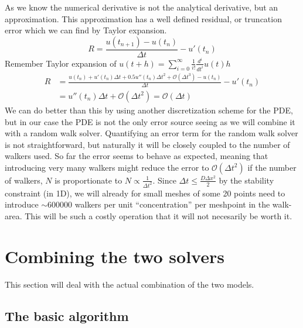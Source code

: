 As we know the numerical derivative is not the analytical derivative, but an approximation. 
This approximation has a well defined residual, or truncation error which we can find by Taylor expansion.
\begin{equation*}
  R = \frac{u(t_{n+1}) -u(t_n)}{\Delta t} -u'(t_n)
\end{equation*}
Remember Taylor expansion of $u(t+h) = \sum\limits_{i=0}^\infty\frac{1}{i!}\frac{d^i}{dt^i}u(t)h$
\begin{align*}
 R &= \frac{u(t_n)+u'(t_n)\Delta t +0.5u''(t_n)\Delta t^2 + \mathcal{O}(\Delta t^3)-u(t_n)}{\Delta t} -u'(t_n)\\
  &= u''(t_n)\Delta t+ \mathcal{O}(\Delta t^2) = \mathcal{O}(\Delta t)
\end{align*}
We can do better than this by using another discretization scheme for the PDE, but in our case the PDE is not the only error source seeing as we will combine it with a random walk solver. 
Quantifying an error term for the random walk solver is not straightforward, but naturally it will be closely coupled to the number of walkers used. 
So far the error seems to behave as expected, meaning that introducing very many walkers might reduce the error to $\mathcal{O}(\Delta t^2)$ if the number of walkers, $N$ is proportionate to $N\propto\frac{1}{\Delta t^2}$. 
Since $\Delta t \leq\frac{D\Delta x^2}{2}$ by the stability constraint (in 1D), we will already for small meshes of some 20 points need to introduce $\sim600000$ walkers per unit ``concentration'' per meshpoint in the walk-area. 
This will be such a costly operation that it will not necesarily be worth it.




\section{Combining the two solvers}\label{combining_the_solvers}
This section will deal with the actual combination of the two models.\\

\subsection{The basic algorithm}\label{basic_algorithm}


